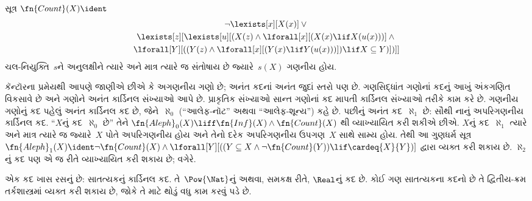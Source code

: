 \begin{prop}
સૂત્ર $\fn{Count}(X) \ident $
\begin{multline*}
\lnot \lexists[x][X(x)] \lor {} \\
\lexists[z][\lexists[u][(X(z) \land
    \lforall[x][(X(x) \lif X(u(x)))] \land {} \\ \lforall[Y][((Y(z) \land
      \lforall[x][(Y(x) \lif Y(u(x)))]) \lif X \subseteq Y)])]]
\end{multline*}
ચલ-નિયુક્તિ~$s$ને અનુલક્ષીને ત્યારે અને માત્ર ત્યારે જ સંતોષાય છે
જ્યારે~$s(X)$ ગણનીય હોય.
\end{prop}

કૅન્ટૉરના પ્રમેયથી આપણે જાણીએ છીએ કે અગણનીય ગણો છે;
અનંત કદનાં અનંત જુદાં સ્તરો પણ છે. ગણસિદ્ધાંત ગણોનાં કદનું આખું
અંકગણિત વિકસાવે છે અને ગણોને અનંત કાર્ડિનલ સંખ્યાઓ આપે છે. પ્રાકૃતિક
સંખ્યાઓ સાન્ત ગણોનાં કદ માપતી કાર્ડિનલ સંખ્યાઓ તરીકે કામ કરે છે.
ગણનીય ગણોનું કદ પહેલું અનંત કાર્ડિનલ કદ છે, જેને~$\aleph_0$
(``આલેફ-નૉટ'' અથવા ``આલેફ-શૂન્ય'') કહે છે. પછીનું અનંત કદ~$\aleph_1$
છે: સૌથી નાનું અપરિગણનીય કાર્ડિનલ કદ. ``$X$નું કદ~$\aleph_0$ છે''
તેને $\fn{Aleph}_0(X) \liff \fn{Inf}(X) \land \fn{Count}(X)$
થી વ્યાખ્યાયિત કરી શકીએ છીએ. $X$નું કદ~$\aleph_1$ ત્યારે અને માત્ર
ત્યારે જ જ્યારે~$X$ પોતે અપરિગણનીય હોય અને તેનો દરેક અપરિગણનીય
ઉપગણ~$X$ સાથે સામ્ય હોય. તેથી આ ગુણધર્મ સૂત્ર
$\fn{Aleph}_1(X) \ident \lnot\fn{Count}(X) \land
\lforall[Y][((Y \subseteq X \land \lnot\fn{Count}(Y))
  \lif \cardeq{X}{Y})]$ દ્વારા વ્યક્ત કરી શકાય છે. $\aleph_2$નું
કદ પણ એ જ રીતે વ્યાખ્યાયિત કરી શકાય છે; વગેરે.

એક કદ ખાસ રસનું છે: સાતત્યકનું કાર્ડિનલ કદ. તે~$\Pow{\Nat}$નું
અથવા, સમકક્ષ રીતે, $\Real$નું કદ છે. કોઈ ગણ સાતત્યકના કદનો છે
તે દ્વિતીય-ક્રમ તર્કશાસ્ત્રમાં વ્યક્ત કરી શકાય છે, જોકે તે માટે
થોડું વધુ કામ કરવું પડે છે.





